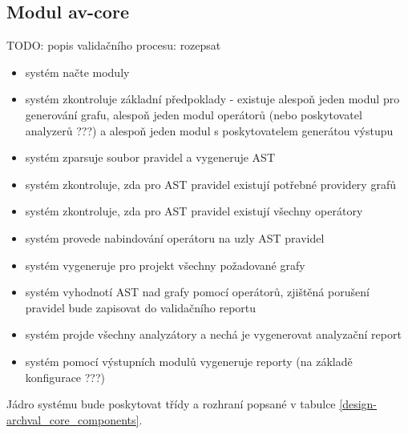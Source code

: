 \subsection{Modul av-core}
TODO: popis validačního procesu: rozepsat
\begin{itemize}
\item systém načte moduly
\item systém zkontroluje základní předpoklady - existuje alespoň jeden modul pro generování grafu, alespoň jeden modul operátorů (nebo poskytovatel analyzerů ???) a alespoň jeden modul s poskytovatelem generátou výstupu
\item systém zparsuje soubor pravidel a vygeneruje AST
\item systém zkontroluje, zda pro AST pravidel existují potřebné providery grafů
\item systém zkontroluje, zda pro AST pravidel existují všechny operátory
\item systém provede nabindování operátoru na uzly AST pravidel
\item systém vygeneruje pro projekt všechny požadované grafy
\item systém vyhodnotí AST nad grafy pomocí operátorů, zjištěná porušení pravidel bude zapisovat do validačního reportu
\item systém projde všechny analyzátory a nechá je vygenerovat analyzační report
\item systém pomocí výstupních modulů vygeneruje reporty (na základě konfigurace ???)
\end{itemize}

Jádro systému bude poskytovat třídy a rozhraní popsané v tabulce \ref{design-archval_core_components}.

